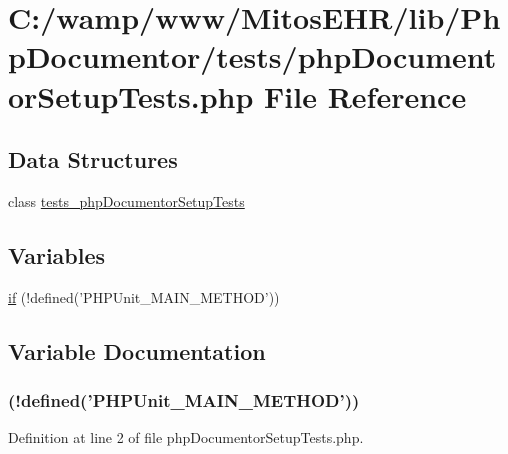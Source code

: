 \hypertarget{php_documentor_setup_tests_8php}{\section{\-C\-:/wamp/www/\-Mitos\-E\-H\-R/lib/\-Php\-Documentor/tests/php\-Documentor\-Setup\-Tests.php \-File \-Reference}
\label{php_documentor_setup_tests_8php}
}
\subsection*{\-Data \-Structures}
\begin{DoxyCompactItemize}
\item 
class \hyperlink{classtests__php_documentor_setup_tests}{tests\-\_\-php\-Documentor\-Setup\-Tests}
\end{DoxyCompactItemize}
\subsection*{\-Variables}
\begin{DoxyCompactItemize}
\item 
\hyperlink{php_documentor_setup_tests_8php_a3120764b3588ecfc55f4be599e83d6f9}{if} (!defined('\-P\-H\-P\-Unit\-\_\-\-M\-A\-I\-N\-\_\-\-M\-E\-T\-H\-O\-D'))
\end{DoxyCompactItemize}


\subsection{\-Variable \-Documentation}
\hypertarget{php_documentor_setup_tests_8php_a3120764b3588ecfc55f4be599e83d6f9}{
\subsubsection[{if}]{(!defined('\-P\-H\-P\-Unit\-\_\-\-M\-A\-I\-N\-\_\-\-M\-E\-T\-H\-O\-D'))}}\label{php_documentor_setup_tests_8php_a3120764b3588ecfc55f4be599e83d6f9}


\-Definition at line 2 of file php\-Documentor\-Setup\-Tests.\-php.


